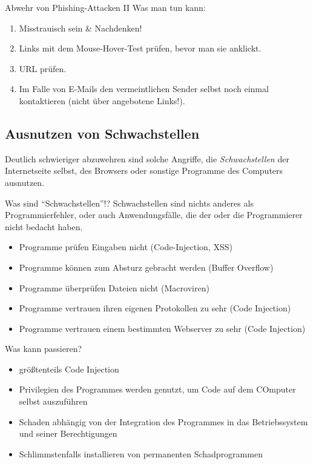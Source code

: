 \documentclass[hyperref={colorlinks,linkcolor=blue}, utf8]{beamer}
\begin{document}
	\begin{frame}{Abwehr von Phishing-Attacken II}
		\alert{Was man tun kann:}
		\begin{enumerate}
			\item Misstrauisch sein \& Nachdenken!
			\item Links mit dem Mouse-Hover-Test prüfen, bevor man sie anklickt.
			\item URL prüfen.
			\item Im Falle von E-Mails den vermeintlichen Sender selbst noch einmal kontaktieren (nicht über angebotene Links!).
		\end{enumerate}
	\end{frame}
	
	\subsection{Ausnutzen von Schwachstellen}
	\begin{frame}
		Deutlich schwieriger abzuwehren sind solche Angriffe, die \emph{Schwachstellen} der Internetseite selbst, des Browsers oder sonstige Programme des Computers ausnutzen.
	\end{frame}

	\begin{frame}
		\begin{block}{Was sind \enquote{Schwachstellen}!?}
			Schwachstellen sind nichts anderes als Programmierfehler, oder auch Anwendungsfälle, die der oder die Programmierer nicht bedacht haben.
		\end{block}
		
		\begin{itemize}
			\item Programme prüfen Eingaben nicht (Code-Injection, XSS)
			\item Programme können zum Absturz gebracht werden (Buffer Overflow)
			\item Programme überprüfen Dateien nicht (Macroviren)
			\item Programme vertrauen ihren eigenen Protokollen zu sehr (Code Injection)
			\item Programme vertrauen einem bestimmten Webserver zu sehr (Code Injection)
		\end{itemize}
	\end{frame}

	\begin{frame}{Was kann passieren?}
		\begin{itemize}
			\item größtenteils Code Injection
			\item Privilegien des Programmes werden genutzt, um Code auf dem COmputer selbst auszuführen
			\item Schaden abhängig von der Integration des Programmes in das Betriebssystem und seiner Berechtigungen
			\item Schlimmstenfalls installieren von permanenten Schadprogrammen
		\end{itemize}
	\end{frame}
\end{document}
